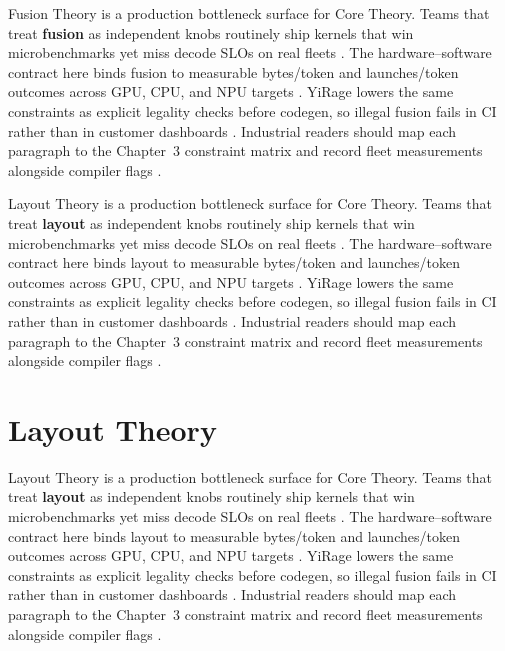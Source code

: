 Fusion Theory is a production bottleneck surface for Core Theory. Teams that treat \textbf{fusion} as independent knobs routinely ship kernels that win microbenchmarks yet miss decode SLOs on real fleets \citep{patel2025llminference,nvidia2022hopper}. The hardware--software contract here binds fusion to measurable bytes/token and launches/token outcomes across GPU, CPU, and NPU targets \citep{taxbreak2026,semianalysis2024tma}. YiRage lowers the same constraints as explicit legality checks before codegen, so illegal fusion fails in CI rather than in customer dashboards \citep{memoryfloor2026,amd2024xdna}. Industrial readers should map each paragraph to the Chapter~3 constraint matrix and record fleet measurements alongside compiler flags \citep{nvidia2022hopper,amd2024aie}.

Layout Theory is a production bottleneck surface for Core Theory. Teams that treat \textbf{layout} as independent knobs routinely ship kernels that win microbenchmarks yet miss decode SLOs on real fleets \citep{taxbreak2026,semianalysis2024tma}. The hardware--software contract here binds layout to measurable bytes/token and launches/token outcomes across GPU, CPU, and NPU targets \citep{memoryfloor2026,amd2024xdna}. YiRage lowers the same constraints as explicit legality checks before codegen, so illegal fusion fails in CI rather than in customer dashboards \citep{nvidia2022hopper,amd2024aie}. Industrial readers should map each paragraph to the Chapter~3 constraint matrix and record fleet measurements alongside compiler flags \citep{semianalysis2024tma,dlbook}.

\section{Layout Theory}
\label{sec:layout_theory}

Layout Theory is a production bottleneck surface for Core Theory. Teams that treat \textbf{layout} as independent knobs routinely ship kernels that win microbenchmarks yet miss decode SLOs on real fleets \citep{memoryfloor2026,amd2024xdna}. The hardware--software contract here binds layout to measurable bytes/token and launches/token outcomes across GPU, CPU, and NPU targets \citep{nvidia2022hopper,amd2024aie}. YiRage lowers the same constraints as explicit legality checks before codegen, so illegal fusion fails in CI rather than in customer dashboards \citep{semianalysis2024tma,dlbook}. Industrial readers should map each paragraph to the Chapter~3 constraint matrix and record fleet measurements alongside compiler flags \citep{amd2024xdna,dao2022flashattention}.

